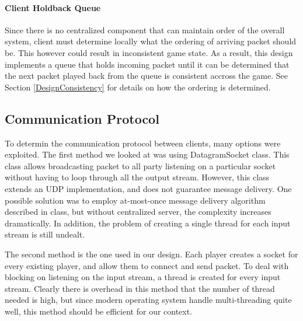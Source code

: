 \paragraph*{Client Holdback Queue}

Since there is no centralized component that can maintain order of the overall system, client must determine locally what the ordering of arriving packet should be. This however could result in inconsistent game state. As a result, this design implements a queue that holds incoming packet until it can be determined that the next packet played back from the queue is consistent accross the game. See Section \ref{DesignConsistency} for details on how the ordering is determined.

\subsection{Communication Protocol}\label{DesignProtocol}

To determin the communication protocol between clients, many options were exploited. The first method we looked at was using DatagramSocket class. This class allows broadcasting packet to all party listening on a particular socket without having to loop through all the output stream. However, this class extends an UDP implementation, and does not guarantee message delivery. One possible solution was to employ at-most-once message delivery algorithm described in class, but without centralized server, the complexity increases dramatically. In addition, the problem of creating a single thread for each input stream is still undealt.

The second method is the one used in our design. Each player creates a socket for every existing player, and allow them to connect and send packet. To deal with blocking on listening on the input stream, a thread is created for every input stream. Clearly there is overhead in this method that the number of thread needed is high, but since modern operating system handle multi-threading quite well, this method should be efficient for our context. 

